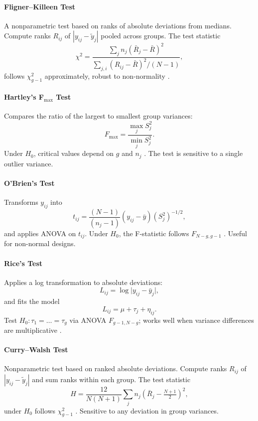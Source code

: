\paragraph{Fligner–Killeen Test}\label{sec:fligner-killeen}
A nonparametric test based on ranks of absolute deviations from medians. Compute ranks $R_{ij}$ of $|y_{ij} - \tilde y_j|$ pooled across groups. The test statistic
\[ 
  \chi^2 = \frac{ \sum_j n_j (\bar R_j - \bar R)^2 }{ \sum_{j,i} (R_{ij} - \bar R)^2 / (N-1) },
\]
follows $\chi^2_{g-1}$ approximately, robust to non-normality \citep{fligner1976distribution}.  

\paragraph{Hartley’s F$_{\max}$ Test}\label{sec:hartley}
Compares the ratio of the largest to smallest group variances:
\[ F_{\max} = \frac{\max_j S_j^2}{\min_j S_j^2}. \]
Under $H_0$, critical values depend on $g$ and $n_j$ \citep{hartley1950maximum}. The test is sensitive to a single outlier variance.

\paragraph{O’Brien’s Test}\label{sec:obrien}
Transforms $y_{ij}$ into
\[ t_{ij} = \frac{(N-1)}{(n_j-1)}(y_{ij} - \bar y)(S_j^2)^{-1/2}, \]
and applies ANOVA on $t_{ij}$. Under $H_0$, the F-statistic follows $F_{N-g, g-1}$ \citep{obrien1979alternative}. Useful for non-normal designs.

\paragraph{Rice’s Test}\label{sec:rice}
Applies a log transformation to absolute deviations:
\[ L_{ij} = \log\bigl|y_{ij} - \bar y_j\bigr|, \]
and fits the model
\[ L_{ij} = \mu + \tau_j + \eta_{ij}. \]
Test $H_0: \tau_1 = \dots = \tau_g$ via ANOVA $F_{g-1,N-g}$; works well when variance differences are multiplicative \citep{rice1980construction}.

\paragraph{Curry–Walsh Test}\label{sec:curry-walsh}
Nonparametric test based on ranked absolute deviations. Compute ranks $R_{ij}$ of $|y_{ij} - \tilde y_j|$ and sum ranks within each group. The test statistic
\[ H = \frac{12}{N(N+1)} \sum_j n_j(\bar R_j - \tfrac{N+1}{2})^2, \]
under $H_0$ follows $\chi^2_{g-1}$ \citep{curry1976homogeneity}. Sensitive to any deviation in group variances.

